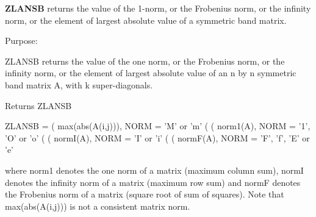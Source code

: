 {\bfseries Z\+L\+A\+N\+S\+B} returns the value of the 1-\/norm, or the Frobenius norm, or the infinity norm, or the element of largest absolute value of a symmetric band matrix. 

 \begin{DoxyParagraph}{Purpose\+: }
\begin{DoxyVerb} ZLANSB  returns the value of the one norm,  or the Frobenius norm, or
 the  infinity norm,  or the element of  largest absolute value  of an
 n by n symmetric band matrix A,  with k super-diagonals.\end{DoxyVerb}

\end{DoxyParagraph}
\begin{DoxyReturn}{Returns}
Z\+L\+A\+N\+S\+B \begin{DoxyVerb}    ZLANSB = ( max(abs(A(i,j))), NORM = 'M' or 'm'
             (
             ( norm1(A),         NORM = '1', 'O' or 'o'
             (
             ( normI(A),         NORM = 'I' or 'i'
             (
             ( normF(A),         NORM = 'F', 'f', 'E' or 'e'

 where  norm1  denotes the  one norm of a matrix (maximum column sum),
 normI  denotes the  infinity norm  of a matrix  (maximum row sum) and
 normF  denotes the  Frobenius norm of a matrix (square root of sum of
 squares).  Note that  max(abs(A(i,j)))  is not a consistent matrix norm.\end{DoxyVerb}
 
\end{DoxyReturn}

